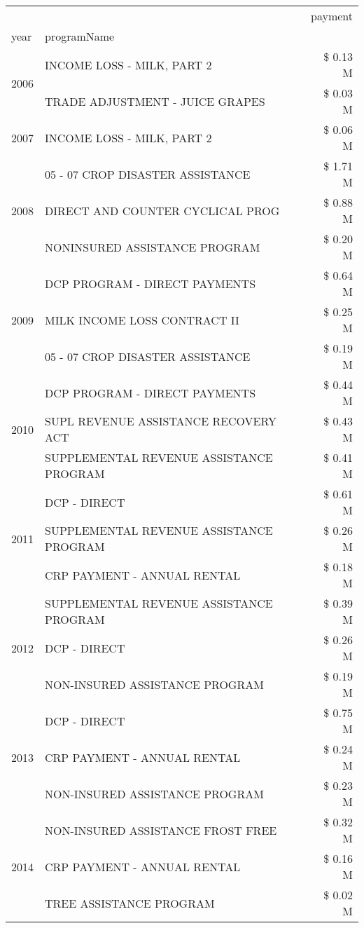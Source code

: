 \begin{tabular}{llr}
\toprule
 &  & payment \\
year & programName &  \\
\midrule
\multirow[t]{2}{*}{2006} & INCOME LOSS - MILK, PART 2 & \$ 0.13 M \\
 & TRADE ADJUSTMENT - JUICE GRAPES & \$ 0.03 M \\
\cline{1-3}
2007 & INCOME LOSS - MILK, PART 2 & \$ 0.06 M \\
\cline{1-3}
\multirow[t]{3}{*}{2008} & 05 - 07 CROP DISASTER ASSISTANCE & \$ 1.71 M \\
 & DIRECT AND COUNTER CYCLICAL PROG & \$ 0.88 M \\
 & NONINSURED ASSISTANCE PROGRAM & \$ 0.20 M \\
\cline{1-3}
\multirow[t]{3}{*}{2009} & DCP PROGRAM - DIRECT PAYMENTS & \$ 0.64 M \\
 & MILK INCOME LOSS CONTRACT II & \$ 0.25 M \\
 & 05 - 07 CROP DISASTER ASSISTANCE & \$ 0.19 M \\
\cline{1-3}
\multirow[t]{3}{*}{2010} & DCP PROGRAM - DIRECT PAYMENTS & \$ 0.44 M \\
 & SUPL REVENUE ASSISTANCE RECOVERY ACT & \$ 0.43 M \\
 & SUPPLEMENTAL REVENUE ASSISTANCE PROGRAM & \$ 0.41 M \\
\cline{1-3}
\multirow[t]{3}{*}{2011} & DCP - DIRECT & \$ 0.61 M \\
 & SUPPLEMENTAL REVENUE ASSISTANCE PROGRAM & \$ 0.26 M \\
 & CRP PAYMENT - ANNUAL RENTAL & \$ 0.18 M \\
\cline{1-3}
\multirow[t]{3}{*}{2012} & SUPPLEMENTAL REVENUE ASSISTANCE PROGRAM & \$ 0.39 M \\
 & DCP - DIRECT & \$ 0.26 M \\
 & NON-INSURED ASSISTANCE PROGRAM & \$ 0.19 M \\
\cline{1-3}
\multirow[t]{3}{*}{2013} & DCP - DIRECT & \$ 0.75 M \\
 & CRP PAYMENT - ANNUAL RENTAL & \$ 0.24 M \\
 & NON-INSURED ASSISTANCE PROGRAM & \$ 0.23 M \\
\cline{1-3}
\multirow[t]{3}{*}{2014} & NON-INSURED ASSISTANCE FROST FREE & \$ 0.32 M \\
 & CRP PAYMENT - ANNUAL RENTAL & \$ 0.16 M \\
 & TREE ASSISTANCE PROGRAM & \$ 0.02 M \\
\cline{1-3}

\end{tabular}

